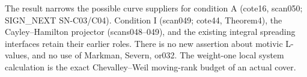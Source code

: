 The result narrows the possible curve suppliers for condition A
(cote16, scan050; SIGN\_NEXT SN-C03/C04). Condition I (scan049;
cote44, Theorem4), the Cayley--Hamilton projector (scans048--049),
and the existing integral spreading interfaces retain their earlier
roles. There is no new assertion about motivic L-values, and no use
of Markman, Severn, or032. The weight-one local system calculation
is the exact Chevalley--Weil moving-rank budget of an actual cover.
